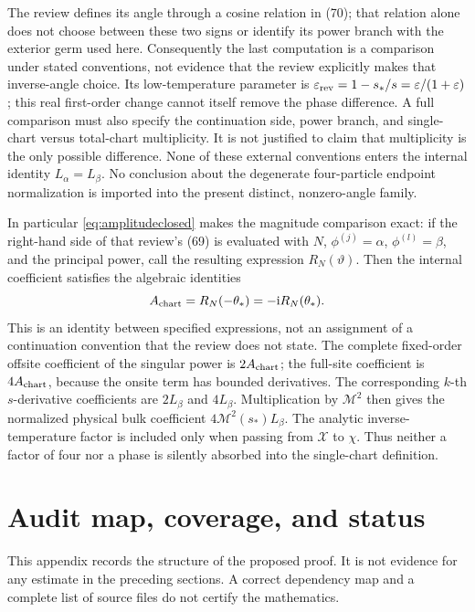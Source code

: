 \documentclass[11pt]{article}
\numberwithin{equation}{section}
\theoremstyle{definition}
\newcommand{\ii}{\mathrm i}
\newcommand{\eps}{\varepsilon}
\newcommand{\M}{\mathcal M}
\begin{document}
The review defines its angle through a cosine relation in (70);
that relation alone does not choose between these two signs or
identify its power branch with the exterior germ used here.
Consequently the last computation is a comparison under stated
conventions, not evidence that the review explicitly makes that
inverse-angle choice. Its low-temperature parameter is
\(\eps_{\rm rev}=1-s_*/s=\eps/(1+\eps)\); this real first-order
change cannot itself remove the phase difference. A full comparison
must also specify the continuation side, power branch, and single-chart
versus total-chart multiplicity. It is not justified to claim that
multiplicity is the only possible difference. None of these external
conventions enters the internal identity \(L_\alpha=L_\beta\).
No conclusion about the degenerate four-particle endpoint normalization
is imported into the present distinct, nonzero-angle family.

In particular \eqref{eq:amplitudeclosed} makes the magnitude comparison
exact: if the right-hand side of that review's (69) is evaluated with
\(N\), \(\phi^{(j)}=\alpha\), \(\phi^{(l)}=\beta\), and the
principal power, call the resulting expression \(R_N(\vartheta)\).
Then the internal coefficient satisfies the algebraic identities
\[
 A_{\rm chart}=R_N(-\theta_*)=-\ii R_N(\theta_*).
\]
This is an identity between specified expressions, not an assignment
of a continuation convention that the review does not state.
The complete fixed-order offsite coefficient of the singular power
is \(2A_{\rm chart}\); the full-site coefficient is
\(4A_{\rm chart}\), because the onsite term has bounded derivatives.
The corresponding \(k\)-th \(s\)-derivative coefficients are
\(2L_\beta\) and \(4L_\beta\). Multiplication by \(\M^2\)
then gives the normalized physical bulk coefficient
\(4\M^2(s_*)L_\beta\). The analytic inverse-temperature factor
is included only when passing from \(\mathcal X\) to \(\chi\).
Thus neither a factor of four nor a phase is silently absorbed into
the single-chart definition.



\section{Audit map, coverage, and status}\label{app:auditmap}
This appendix records the structure of the proposed proof. It is not
evidence for any estimate in the preceding sections. A correct
dependency map and a complete list of source files do not certify
the mathematics.
\end{document}
